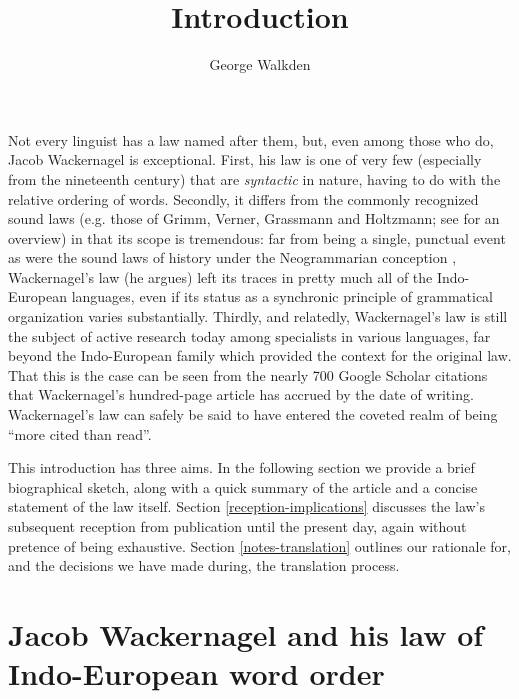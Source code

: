 \documentclass[output=paper]{../langscibook}
\author{George Walkden\affiliation{University of Konstanz}\orcid{0000-0001-5950-9686}}
\title{Introduction}
\begin{document}
\maketitle
\renewcommand{\lsCollectionPaperCitationText}{George Walkden. 2020. Introduction. In Jacob Wackernagel, On a law of Indo-European word order: Über ein Gesetz der indogermanischen Wortstellung, 3–19. Berlin: Language Science Press. DOI: \href{https://doi.org/zenodo.3984869}{\nolinkurl{10.5281/zenodo.3984869}}~}
\ifoot[\lsCollectionPaperCitation]{}


Not every linguist has a law named after them, but, even among those who do, Jacob Wackernagel is exceptional. First, his law is one of very few (especially from the nineteenth century) that are \emph{syntactic} in nature, having to do with the relative ordering of words. Secondly, it differs from the commonly recognized sound laws (e.g. those of Grimm, Verner, Grassmann and Holtzmann; see \citealp{Collinge1985} for an overview) in that its scope is tremendous: far from being a single, punctual event as were the sound laws of history under the Neogrammarian conception \citep{OsthoffBrugmann1878}, Wackernagel's law (he argues) left its traces in pretty much all of the Indo-European languages, even if its status as a synchronic principle of grammatical organization varies substantially. Thirdly, and relatedly, Wackernagel's law is still the subject of active research today among specialists in various languages, far beyond the Indo-European family which provided the context for the original law. That this is the case can be seen from the nearly 700 Google Scholar citations that Wackernagel's \citeyearpar{Wackernagel1892} hundred-page article has accrued by the date of writing. Wackernagel's law can safely be said to have entered the coveted realm of being ``more cited than read''.

This introduction has three aims. In the following section we provide a brief biographical sketch, along with a quick summary of the article and a concise statement of the law itself. Section \ref{reception-implications} discusses the law's subsequent reception from publication until the present day, again without pretence of being exhaustive. Section \ref{notes-translation} outlines our rationale for, and the decisions we have made during, the translation process.

\section{Jacob Wackernagel and his law of Indo-European word order}\label{intro-biography}
\end{document}
